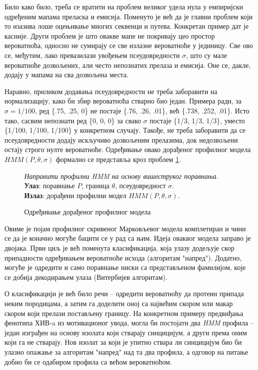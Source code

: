\documentclass[12pt,oneside]{memoir}
\newenvironment{problem}[1][!ht]
{\renewcommand{\algorithmcfname}{Проблем}
\begin{figure}[!ht]
\centering
  \begin{minipage}{.94\linewidth}
	\begin{algorithm}[#1]%
  }{\end{algorithm}
  \end{minipage}
\end{figure}}
\begin{document}
\begin{CJK}{UTF8}{ipxm}
Било како било, треба се вратити на проблем великог удела нула у емпиријски одређеним мапама преласка и емисија. Поменуто је већ да је главни проблем који то изазива лоше оцењивање многих секвенци и путева. Конкретан пример дат је касније. Други проблем је што овакве мапе не покривају цео простор вероватноћа, односно не сумирају се све излазне вероватноће у јединицу. Све ово се, међутим, лако превазилази увођењем псеудовредности $\sigma$, што су мале вероватноће дозвољених, али често непознатих прелаза и емисија. Оне се, дакле, додају у мапама на сва дозвољена места.

Наравно, приликом додавања псеудовредности не треба заборавити на нормализацију, како би збир вероватноћа стварно био један. Примера ради, за $\sigma = 1/100$, ред \{.75, .25, 0\} не постаје \{.76, .26, .01\}, већ \{.738, .252, .01\}. Исто тако, сасвим непознати ред \{0, 0, 0\} за свако $\sigma$ постаје \{1/3, 1/3, 1/3\}, уместо \{1/100, 1/100, 1/100\} у конкретном случају. Такође, не треба заборавити да се псеудовредности додају искључиво дозвољеним прелазима, док недозвољени остају строго нулте вероватноће. Одређивање овако дорађеног профилног модела $HMM(P, \theta, \sigma)$ формално се представља кроз проблем \ref{prob:prof_sigma}.

\begin{problem}[H]
  \SetAlgoLined
  \textit{Направити профилни \textit{HMM} на основу вишеструког поравнања.}\\
  \textbf{Улаз}: поравнање $P$, граница $\theta$, псеудовредност $\sigma$.\\
  \textbf{Излаз}: дорађени профилни модел $HMM(P, \theta, \sigma)$.
  \caption{Одређивање дорађеног профилног модела\cite{ba10f}}
  \label{prob:prof_sigma}
\end{problem}

Овиме је појам профилног скривеног Марковљевог модела комплетиран и чини се да је коначно могуће бацити се у рад са њим. Идеја оваквог модела заправо је двојака. Први циљ је већ поменута класификација, која улазу додељује скор припадности одређивањем вероватноће исхода (алгоритам "напред"). Додатно, могуће је одредити и само поравнање ниски са представљеном фамилијом, које се добија декодирањем улаза (Витербијев алгоритам).

О класификацији је већ било речи -- одредити вероватноћу да протеин припада неким породицама, а затим га доделити оној са највећим скором или макар скором који прелази постављену границу. На конкретном примеру предвиђања фенотипа ХИВ-a из мотивационог увода, могла би постојати два \textit{HMM} профила -- један изграђен на основу изолата који стварају синцицијум, а други према оним који га не стварају. Нов изолат за који је упитно ствара ли синцицијум био би улазно опажање за алгоритам "напред" над та два профила, а одговор на питање добио би се одабиром профила са већом вероватноћом.


\end{CJK}
\end{document}
